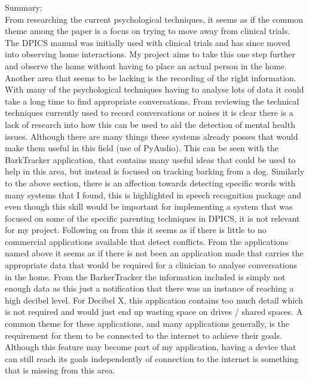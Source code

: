 \documentclass[a4paper,11pt]{report}
\begin{document}
Summary:\\
From researching the current psychological techniques, it seems as if the common theme among the paper is a focus on trying to move away from clinical trials. The DPICS manual was initially used with clinical trials and has since moved into observing home interactions. My project aims to take this one step further and observe the home without having to place an actual person in the home. Another area that seems to be lacking is the recording of the right information. With many of the psychological techniques having to analyse lots of data it could take a long time to find appropriate conversations.
From reviewing the technical techniques currently used to record conversations or noises it is clear there is a lack of research into how this can be used to aid the detection of mental health issues. Although there are many things these systems already posses that would make them useful in this field (use of PyAudio). This can be seen with the BarkTracker application, that contains many useful ideas that could be used to help in this area, but instead is focused on tracking barking from a dog. Similarly to the above section, there is an affection towards detecting specific words with many systems that I found, this is highlighted in speech recognition package and even though this skill would be important for implementing a system that was focused on some of the specific parenting techniques in DPICS, it is not relevant for my project. Following on from this it seems as if there is little to no commercial applications available that detect conflicts.
From the applications named above it seems as if there is not been an application made that carries the appropriate data that would be required for a clinician to analyse conversations in the home. From the BarkerTracker the information included is simply not enough data as this just a notification that there was an instance of reaching a high decibel level. For Decibel X, this application contains too much detail which is not required and would just end up wasting space on drives / shared spaces. A common theme for these applications, and many applications generally, is the requirement for them to be connected to the internet to achieve their goals. Although this feature may become part of my application, having a device that can still reach its goals independently of connection to the internet is something that is missing from this area.
\end{document}
